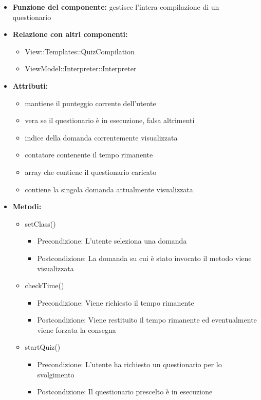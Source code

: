   \begin{itemize}
 \item\textbf{Funzione del componente:} gestisce l'intera compilazione di un questionario
 \item\textbf{Relazione con altri componenti:}
 \begin{itemize}
	\item View::Templates::QuizCompilation
	\item ViewModel::Interpreter::Interpreter
 \end{itemize}
 \item\textbf{Attributi:}
 \begin{itemize}
		\item{} mantiene il punteggio corrente dell'utente
		\item{} vera se il questionario è in esecuzione, falsa altrimenti
		\item{} indice della domanda correntemente visualizzata
		\item{} contatore contenente il tempo rimanente
		\item{} array che contiene il questionario caricato
		\item{} contiene la singola domanda attualmente visualizzata
 \end{itemize}
 \item\textbf{Metodi:}
 	\begin{itemize}
\item setClass()
\begin{itemize}
	\item{Precondizione: L'utente seleziona una domanda}
	\item{Postcondizione: La domanda su cui è stato invocato il metodo viene visualizzata}
\end{itemize}
\item checkTime()
\begin{itemize}
	\item{Precondizione: Viene richiesto il tempo rimanente}
	\item{Postcondizione: Viene restituito il tempo rimanente ed eventualmente viene forzata la consegna}
\end{itemize}
\item startQuiz()
\begin{itemize}
	\item{Precondizione: L'utente ha richiesto un questionario per lo svolgimento}
	\item{Postcondizione: Il questionario prescelto è in esecuzione}

\end{itemize}
\end{itemize}
\end{itemize}
